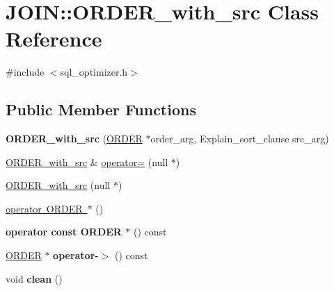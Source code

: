 \hypertarget{classJOIN_1_1ORDER__with__src}{}\section{J\+O\+IN\+:\+:O\+R\+D\+E\+R\+\_\+with\+\_\+src Class Reference}
\label{classJOIN_1_1ORDER__with__src}


{\ttfamily \#include $<$sql\+\_\+optimizer.\+h$>$}

\subsection*{Public Member Functions}
\begin{DoxyCompactItemize}
\item 
\mbox{\label{classJOIN_1_1ORDER__with__src_a60528945102cba026e2b0492acd1b2a6}} 
{\bfseries O\+R\+D\+E\+R\+\_\+with\+\_\+src} (\mbox{\hyperlink{structst__order}{O\+R\+D\+ER}} $\ast$order\+\_\+arg, Explain\+\_\+sort\+\_\+clause src\+\_\+arg)
\item 
\mbox{\hyperlink{classJOIN_1_1ORDER__with__src}{O\+R\+D\+E\+R\+\_\+with\+\_\+src}} \& \mbox{\hyperlink{classJOIN_1_1ORDER__with__src_a49eb9a1753368a1a8cb497ec2b76e468}{operator=}} (null $\ast$)
\item 
\mbox{\hyperlink{classJOIN_1_1ORDER__with__src_a6fce7a1ed37a7f05a46aa76f08f345c6}{O\+R\+D\+E\+R\+\_\+with\+\_\+src}} (null $\ast$)
\item 
\mbox{\hyperlink{classJOIN_1_1ORDER__with__src_a2d64ba9d78fc1497d0c814f3d1a78a05}{operator O\+R\+D\+E\+R $\ast$}} ()
\item 
\mbox{\label{classJOIN_1_1ORDER__with__src_a546d0d7e71edbdde02c67169baa5c33a}} 
{\bfseries operator const O\+R\+D\+E\+R $\ast$} () const
\item 
\mbox{\label{classJOIN_1_1ORDER__with__src_a34ff798995c88533567f4a219028151f}} 
\mbox{\hyperlink{structst__order}{O\+R\+D\+ER}} $\ast$ {\bfseries operator-\/$>$} () const
\item 
\mbox{\label{classJOIN_1_1ORDER__with__src_aa9a352d4a1e209ae2759e30de6454d89}} 
void {\bfseries clean} ()
\item 

\end{DoxyCompactItemize}

